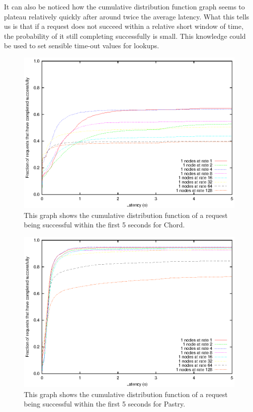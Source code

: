 It can also be noticed how the cumulative distribution function graph seems to plateau relatively quickly after around twice the average latency. What this tells us is that if a request does not succeed within a relative short window of time, the probability of it still completing successfully is small. This knowledge could be used to set sensible time-out values for lookups.

\begin{figure}[!htbp]
  \begin{center}
    \includegraphics[width=0.9\linewidth]{illustrations/cdf_chord.eps}
    \caption{This graph shows the cumulative distribution function of a request being successful within the first 5 seconds for Chord.}
    \label{figChordCDF}
  \end{center}
\end{figure}

\begin{figure}[!htbp]
  \begin{center}
    \includegraphics[width=0.9\linewidth]{illustrations/cdf_pastry.eps}
    \caption{This graph shows the cumulative distribution function of a request being successful within the first 5 seconds for Pastry.}
    \label{figPastryCDF}
  \end{center}
\end{figure}

